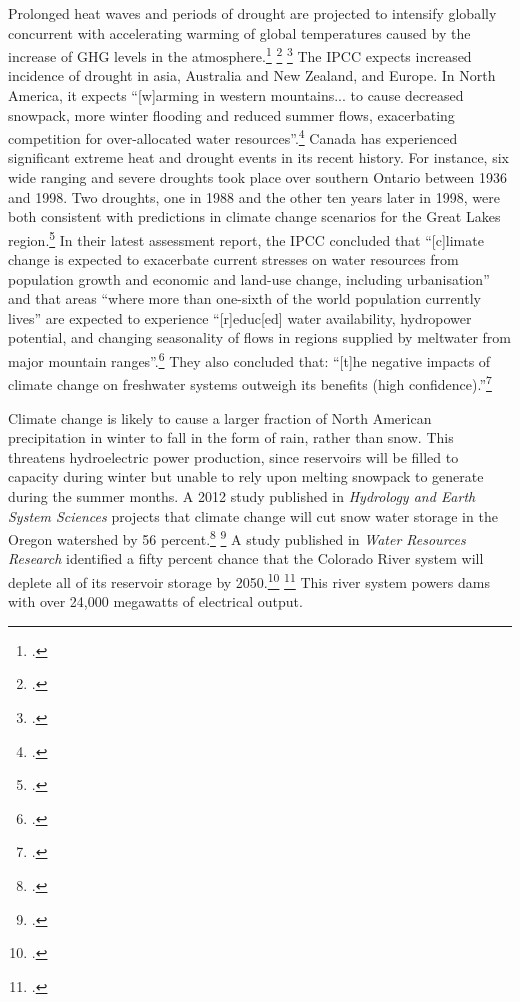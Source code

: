 Prolonged heat waves and periods of drought are projected to intensify globally concurrent with accelerating warming of global temperatures caused by the increase of GHG levels in the atmosphere.\footcite[][]{Coumou2013} \footcite[See also: ][]{HeatWavesFrequentSevere} \footcite[][]{Tollefson2012}
The IPCC expects increased incidence of drought in asia, Australia and New Zealand, and Europe.
In North America, it expects ``[w]arming in western mountains... to cause decreased snowpack, more winter flooding and reduced summer flows, exacerbating competition for over-allocated water resources''.\footcite[][See: Synthesis report, Table SPM.2. Examples of some projected regional impacts. \url{https://www.ipcc.ch/publications_and_data/ar4/syr/en/spms3.html}]{IPCC2007}
Canada has experienced significant extreme heat and drought events in its recent history. 
For instance, six wide ranging and severe droughts took place over southern Ontario between 1936 and 1998. 
Two droughts, one in 1988 and the other ten years later in 1998, were both consistent with predictions in climate change scenarios for the Great Lakes region.\footcite[][]{Koshida2005}
In their latest assessment report, the IPCC concluded that ``[c]limate change is expected to exacerbate current stresses on water resources from population growth and economic and land-use change, including urbanisation'' and that areas ``where more than one-sixth of the world population currently lives'' are expected to experience ``[r]educ[ed] water availability, hydropower potential, and changing seasonality of flows in regions supplied by meltwater from major mountain ranges''.\footcite[][p. 49]{IPCCar4_syr}
They also concluded that: ``[t]he negative impacts of climate change on freshwater systems outweigh its benefits (high confidence).''\footcite[][p. 49]{IPCCar4_syr}



Climate change is likely to cause a larger fraction of North American precipitation in winter to fall in the form of rain, rather than snow.
This threatens hydroelectric power production, since reservoirs will be filled to capacity during winter but unable to rely upon melting snowpack to generate during the summer months.
A 2012 study published in \emph{Hydrology and Earth System Sciences} projects that climate change will cut snow water storage in the Oregon watershed by 56 percent.\footcite[][]{Sproles2012} \footcite[][]{OregonSnowpack}
A study published in \emph{Water Resources Research} identified a fifty percent chance that the Colorado River system will deplete all of its reservoir storage by 2050.\footcite[][]{ColoradoReservoirs} \footcite[See also: ][]{DryingWest2011}
This river system powers dams with over 24,000 megawatts of electrical output.



